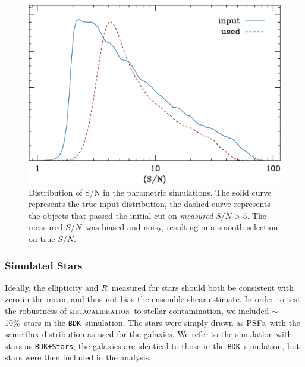 \documentclass[iop]{emulateapj}
\newcommand{\snr}{$S/N$}
\newcommand{\mcal}{\textsc{metacalibration}}
\newcommand{\mcalR}{\mbox{\boldmath $R$}}
\newcommand{\nsimNstarperc}{10\%}
\newcommand{\bdsim}{\texttt{BDK}}
\newcommand{\bdstar}{\texttt{BDK+Stars}}
\begin{document}
\begin{figure}
    \centering
    \includegraphics[width=\columnwidth]{run-bdj03mcal02-s2n.eps}

    \caption{Distribution of S/N in the parametric simulations. The
    solid curve represents the true input distribution, the dashed curve 
	represents the objects that passed the initial cut on {\it measured}
    \snr$ > 5$. The measured \snr\ was biased and noisy,
    resulting in a smooth selection on true \snr.}

\label{fig:s2n}
\end{figure}

\subsubsection{Simulated Stars}

Ideally, the ellipticity and \mcalR\ measured for stars should both be
consistent with zero in the mean, and thus not bias the ensemble shear
estimate.  In order to test the robustness of \mcal\ to stellar contamination,
we included $\sim$\nsimNstarperc\ stars in the \bdsim\ simulation.  The stars
were simply drawn as PSFs, with the same flux distribution as used for the
galaxies.  We refer to the simulation with stars as \bdstar; the
galaxies are identical to those in the \bdsim\ simulation, but stars
were then included in the analysis.
\end{document}
